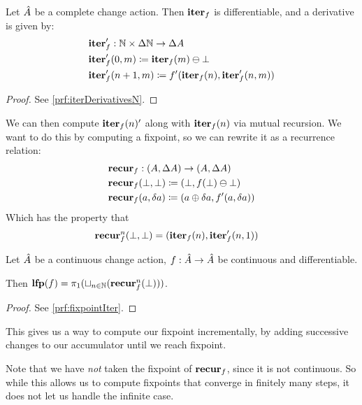 \begin{prop}[name=Derivative of the iteration map with respect to $n$, restate=iterDerivativesN]
  \label{prop:iterDerivativesN}
  Let $\hat{A}$ be a complete change action. Then $\textbf{iter}_f$ is differentiable, and a derivative is given by:
  \begin{align*}
    &\textbf{iter}_f': \mathbb{N} \times \Delta \mathbb{N} \rightarrow \Delta A\\
    &\textbf{iter}_f'(0, m) \coloneqq \textbf{iter}_f(m) \ominus \bot\\
    &\textbf{iter}_f'(n+1, m) \coloneqq f'(\textbf{iter}_f(n), \textbf{iter}_f'(n, m))
  \end{align*}
\end{prop}
\ifproofs
\begin{proof}
  See \cref{prf:iterDerivativesN}.
\end{proof}
\fi

We can then compute $\textbf{iter}_f(n)'$ along with $\textbf{iter}_f(n)$ via mutual recursion.
We want to do this by computing a fixpoint, so we can rewrite it as a recurrence
relation:
\begin{align*}
  &\textbf{recur}_f : (A, \Delta A) \rightarrow (A, \Delta A)\\
  &\textbf{recur}_f (\bot, \bot) \coloneqq (\bot, f(\bot) \ominus \bot)\\
  &\textbf{recur}_f (a, \delta a) \coloneqq (a \oplus \delta a, f'(a, \delta a))
\end{align*}
Which has the property that
\begin{align*}
  &\textbf{recur}_f^n (\bot, \bot) = (\textbf{iter}_f(n), \textbf{iter}_f'(n, 1))
\end{align*}

\begin{thm}[name=Incremental computation of least fixpoints, restate=fixpointIter]
\label{thm:fixpointIter}
  Let $\hat{A}$ be a continuous change action, $f: \hat{A} \rightarrow
  \hat{A}$ be continuous and differentiable.

  Then $\textbf{lfp}(f) = \pi_1(\sqcup_{n \in \mathbb{N}}(\textbf{recur}_f^n(\bot)))$.
\end{thm}
\ifproofs
\begin{proof}
  See \cref{prf:fixpointIter}.
\end{proof}
\fi

This gives us a way to compute our fixpoint incrementally, by adding successive
changes to our accumulator until we reach fixpoint.

Note that we have \emph{not} taken the fixpoint of $\textbf{recur}_f$, since it is
not continuous. So while this allows us to compute fixpoints that converge in
finitely many steps, it does not let us handle the infinite case.

